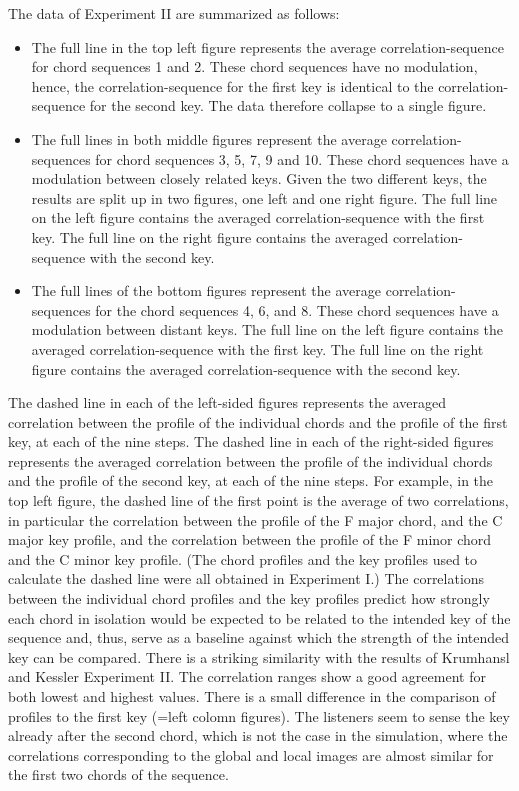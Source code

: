 The data of Experiment II are summarized as follows:
\begin{itemize}
\item
    The full line in the top left figure represents the average
    correlation-sequence for chord sequences 1 and 2. These chord
    sequences have no modulation, hence, the correlation-sequence for
    the first key is identical to the correlation-sequence for the
    second key. The data therefore collapse to a single figure.
\item
    The full lines in both middle figures represent the average
    correlation-sequences for chord sequences 3, 5, 7, 9 and 10. These
    chord sequences have a modulation between closely related keys.
    Given the two different keys, the results are split up in two
    figures, one left and one right figure. The full line on the left
    figure contains the averaged correlation-sequence with the first
    key. The full line on the right figure contains the averaged
    correlation-sequence with the second key.
\item
    The full lines of the bottom figures represent the average
    correlation-sequences for the chord sequences 4, 6, and 8. These
    chord sequences have a modulation between distant keys. The full
    line on the left figure contains the averaged correlation-sequence
    with the first key. The full line on the right figure contains the
    averaged correlation-sequence with the second key.
\end{itemize}
The dashed line in each of the left-sided figures represents the
averaged correlation between the profile of the individual chords
and the profile of the first key, at each of the nine steps. The
dashed line in each of the right-sided figures represents the
averaged correlation between the profile of the individual chords
and the profile of the second key, at each of the nine steps. For
example, in the top left figure, the dashed line of the first
point is the average of two correlations, in particular the
correlation between the profile of the F major chord, and the C
major key profile, and the correlation between the profile of the
F minor chord and the C minor key profile. (The chord profiles and
the key profiles used to calculate the dashed line were all
obtained in Experiment I.) The correlations between the individual
chord profiles and the key profiles predict how strongly each
chord in isolation would be expected to be related to the intended
key of the sequence and, thus, serve as a baseline against which
the strength of the intended key can be compared. There is a
striking similarity with the results of Krumhansl and Kessler
Experiment II. The correlation ranges show a good agreement for
both lowest and highest values. There is a small difference in
the comparison of profiles to the first key (=left colomn
figures). The listeners seem to sense the key already after the
second chord, which is not the case in the simulation, where the
correlations corresponding to the global and local images are
almost similar for the first two chords of the sequence.
